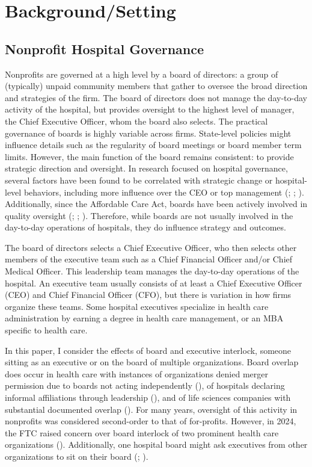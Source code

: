 \documentclass[12pt]{article}
\begin{document}
    \section{Background/Setting}\label{sec:background}

    \subsection{Nonprofit Hospital Governance}

    Nonprofits are governed at a high level by a board of directors: a group of (typically) unpaid community members that gather to oversee the broad direction and strategies of the firm. The board of directors does not manage the day-to-day activity of the hospital, but provides oversight to the highest level of manager, the Chief Executive Officer, whom the board also selects. The practical governance of boards is highly variable across firms. State-level policies might influence details such as the regularity of board meetings or board member term limits. However, the main function of the board remains consistent: to provide strategic direction and oversight. In research focused on hospital governance, several factors have been found to be correlated with strategic change or hospital-level behaviors, including more influence over the CEO or top management (\cite{golden2001will}; \cite{alexander2008governance}; \cite{jiang2012enhancing}). Additionally, since the Affordable Care Act, boards have been actively involved in quality oversight (\cite{jha2010hospital}; \cite{prybil2014board}; \cite{prybil2010board}). Therefore, while boards are not usually involved in the day-to-day operations of hospitals, they do influence strategy and outcomes.

    The board of directors selects a Chief Executive Officer, who then selects other members of the executive team such as a Chief Financial Officer and/or Chief Medical Officer. This leadership team manages the day-to-day operations of the hospital. An executive team usually consists of at least a Chief Executive Officer (CEO) and Chief Financial Officer (CFO), but there is variation in how firms organize these teams. Some hospital executives specialize in health care administration by earning a degree in health care management, or an MBA specific to health care. 

    In this paper, I consider the effects of board and executive interlock, someone sitting as an executive or on the board of multiple organizations. Board overlap does occur in health care with instances of organizations denied merger permission due to boards not acting independently (\cite{huberfeld2006tackling}), of hospitals declaring informal affiliations through leadership (\cite{barnett_babcock_2012}), and of life sciences companies with substantial documented overlap (\cite{manjunath2024illegal}). For many years, oversight of this activity in nonprofits was considered second-order to that of for-profits. However, in 2024, the FTC raised concern over board interlock of two prominent health care organizations (\cite{ftc2025sevita}). Additionally, one hospital board might ask executives from other organizations to sit on their board (\cite{gordon2025ftc}; \cite{alston2024governance}). 
\end{document}
